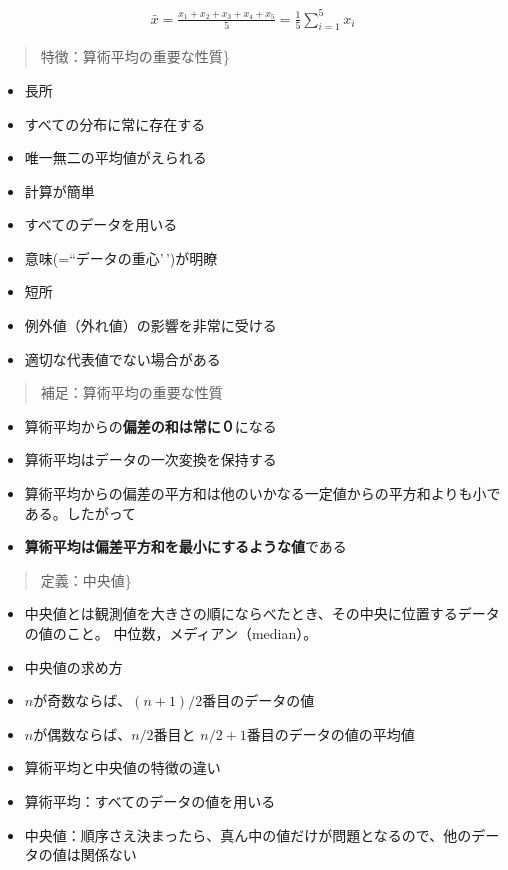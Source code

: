\documentclass[
]{book}
\providecommand{\tightlist}{%
  \setlength{\itemsep}{0pt}\setlength{\parskip}{0pt}}
\theoremstyle{definition}
\theoremstyle{definition}
\theoremstyle{definition}
\theoremstyle{definition}
\theoremstyle{remark}
\begin{document}
\begin{align*}
\bar{x}=\frac{x_1+x_2+x_3+x_4+x_5}{5}=\frac{1}{5}\sum_{i=1}^5 x_i
\end{align*}

\begin{quote}
特徴：算術平均の重要な性質\}
\end{quote}

\begin{itemize}
\item
  長所
\item
  すべての分布に常に存在する
\item
  唯一無二の平均値がえられる
\item
  計算が簡単
\item
  すべてのデータを用いる
\item
  意味(=``データの重心'\,')が明瞭
\item
  短所
\item
  例外値（外れ値）の影響を非常に受ける
\item
  適切な代表値でない場合がある
\end{itemize}

\begin{quote}
補足：算術平均の重要な性質
\end{quote}

\begin{itemize}
\tightlist
\item
  算術平均からの\textbf{偏差の和は常に０}になる
\item
  算術平均はデータの一次変換を保持する
\item
  算術平均からの偏差の平方和は他のいかなる一定値からの平方和よりも小である。したがって
\item
  \textbf{算術平均は偏差平方和を最小にするような値}である
\end{itemize}

\begin{quote}
定義：中央値\}
\end{quote}

\begin{itemize}
\item
  中央値とは観測値を大きさの順にならべたとき、その中央に位置するデータの値のこと。
  中位数，メディアン（median）。
\item
  中央値の求め方
\item
  \(n\)が奇数ならば、\((n+1)/2\)番目のデータの値
\item
  \(n\)が偶数ならば、\(n/2\)番目と \(n/2+1\)番目のデータの値の平均値
\item
  算術平均と中央値の特徴の違い
\item
  算術平均：すべてのデータの値を用いる
\item
  中央値：順序さえ決まったら、真ん中の値だけが問題となるので、他のデータの値は関係ない
\end{itemize}
\end{document}
